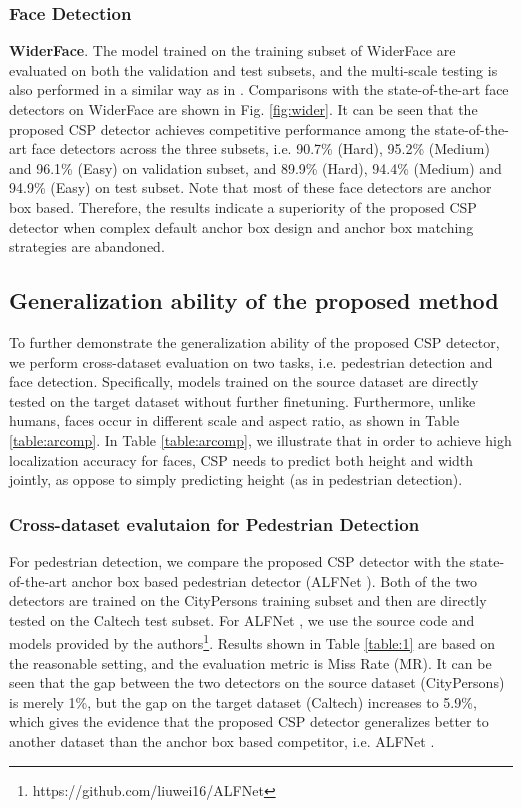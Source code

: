 \subsubsection{Face Detection}
\textbf{WiderFace}.
The model trained on the training subset of WiderFace are evaluated on both the validation and test subsets, and the multi-scale testing is also performed in a similar way as in \cite{Tang_2018_ECCV}. Comparisons with the state-of-the-art face detectors on WiderFace are shown in Fig. \ref{fig:wider}. It can be seen that the proposed CSP detector achieves competitive performance among the state-of-the-art face detectors across the three subsets, i.e. 90.7\% (Hard), 95.2\% (Medium) and 96.1\% (Easy) on validation subset, and 89.9\% (Hard), 94.4\% (Medium) and 94.9\% (Easy) on test subset. Note that most of these face detectors are anchor box based. Therefore, the results indicate a superiority of the proposed CSP detector when complex default anchor box design and anchor box matching strategies are abandoned.

\subsection{Generalization ability of the proposed method}
To further demonstrate the generalization ability of the proposed CSP detector, we perform cross-dataset evaluation on two tasks, i.e. pedestrian detection and face detection. Specifically, models trained on the source dataset are directly tested on the target dataset without further finetuning. Furthermore, unlike humans, faces occur in different scale and aspect ratio, as shown in Table \ref{table:arcomp}. In Table \ref{table:arcomp}, we illustrate that in order to achieve high localization accuracy for faces, CSP needs to predict both height and width jointly, as oppose to simply predicting height (as in pedestrian detection).

\subsubsection{Cross-dataset evalutaion for Pedestrian Detection}
For pedestrian detection, we compare the proposed CSP detector with the state-of-the-art anchor box based pedestrian detector (ALFNet \cite{Liu_2018_ECCV}). Both of the two detectors are trained on the CityPersons \cite{zhang2017citypersons} training subset and then are directly tested on the Caltech \cite{dollar2012pedestrian} test subset. For ALFNet \cite{Liu_2018_ECCV}, we use the source code and models provided by the authors\footnote{https://github.com/liuwei16/ALFNet}.
Results shown in Table \ref{table:1} are based on the reasonable setting, and the evaluation metric is Miss Rate (MR). It can be seen that the gap between the two detectors on the source dataset (CityPersons) is merely 1\%, but the gap on the target dataset (Caltech) increases to 5.9\%, which gives the evidence that the proposed CSP detector generalizes better to another dataset than the anchor box based competitor, i.e. ALFNet \cite{Liu_2018_ECCV}.

